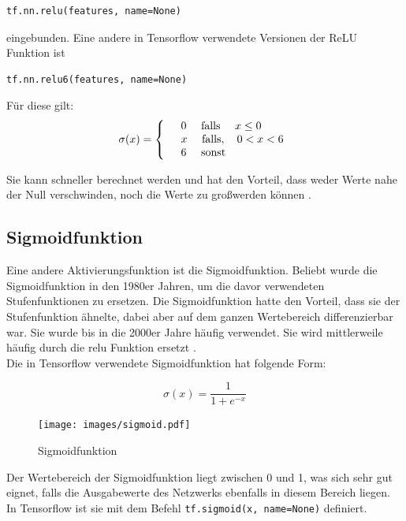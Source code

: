 \vspace{0.3cm}
\begin{lstlisting}
tf.nn.relu(features, name=None)
\end{lstlisting} 

eingebunden. Eine andere in Tensorflow verwendete Versionen der \gls{ReLU} Funktion ist \cite{cookbook}

\vspace{0.3cm}
\begin{lstlisting}
tf.nn.relu6(features, name=None)
\end{lstlisting}
F\"ur diese gilt:
\begin{align*}
	\sigma(x)=
	\left\{
	\begin{array}{l l}
		& 0 \quad \text{   falls  } \quad x \leq 0  \\ 
		& x \quad \text{   falls},\quad 0 < x < 6 \\
		& 6 \quad \text{   sonst}
	\end{array}
	\right.
\end{align*}

Sie kann schneller berechnet werden und hat den Vorteil, dass weder Werte nahe der Null verschwinden, noch die Werte zu gro\ss werden k\"onnen \cite{cookbook}.


\subsection{Sigmoidfunktion}
Eine andere Aktivierungsfunktion ist die Sigmoidfunktion. Beliebt wurde die Sigmoidfunktion in den 1980er Jahren, um die davor verwendeten Stufenfunktionen zu ersetzen. Die Sigmoidfunktion hatte den Vorteil, dass sie der Stufenfunktion ähnelte, dabei aber auf dem ganzen Wertebereich differenzierbar war. Sie wurde bis in die 2000er Jahre häufig verwendet. Sie wird mittlerweile häufig durch die relu Funktion ersetzt \cite{Goodfellow}. \\
Die in Tensorflow verwendete Sigmoidfunktion hat folgende Form: \cite{cookbook}

\begin{equation}
\sigma(x)=\frac{1}{1+e^{-x}}
\end{equation}

\begin{figure}[!htp]
	\centering
	\texttt{[image: images/sigmoid.pdf]}
	\caption{Sigmoidfunktion \cite{building}}
\end{figure}


Der Wertebereich der Sigmoidfunktion liegt zwischen 0 und 1, was sich sehr gut eignet, falls die Ausgabewerte des Netzwerks ebenfalls in diesem Bereich liegen. In Tensorflow ist sie mit dem Befehl \lstinline$tf.sigmoid(x, name=None)$ \cite{building}
definiert.


